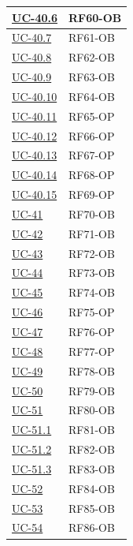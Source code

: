 ﻿\documentclass[a4paper,12pt]{article}
\begin{document}
\begin{description}[style=multiline, leftmargin=4cm, font=\bfseries]
\begin{enumerate}[leftmargin=*, nosep]
{\begin{longtable}{|p{4cm}|p{4cm}|}
    \hline
    \hyperref[fig:uc-40.6]{UC-40.6} & RF60-OB \\
    \hline
    \hyperref[fig:uc-40.7]{UC-40.7} & RF61-OB \\
    \hline
    \hyperref[fig:uc-40.8]{UC-40.8} & RF62-OB \\
    \hline
    \hyperref[fig:uc-40.9]{UC-40.9} & RF63-OB \\
    \hline
    \hyperref[fig:uc-40.10]{UC-40.10} & RF64-OB \\
    \hline
    \hyperref[fig:uc-40.11]{UC-40.11} & RF65-OP \\
    \hline
    \hyperref[fig:uc-40.12]{UC-40.12} & RF66-OP \\
    \hline
    \hyperref[fig:uc-40.13]{UC-40.13} & RF67-OP \\
    \hline
    \hyperref[fig:uc-40.14]{UC-40.14} & RF68-OP \\
    \hline
    \hyperref[fig:uc-40.15]{UC-40.15} & RF69-OP \\
    \hline
    \hyperref[fig:uc-41]{UC-41} & RF70-OB \\
    \hline
    \hyperref[fig:uc-42]{UC-42} & RF71-OB \\
    \hline
    \hyperref[fig:uc-43]{UC-43} & RF72-OB \\
    \hline
    \hyperref[fig:uc-44]{UC-44} & RF73-OB \\
    \hline
    \hyperref[fig:uc-45]{UC-45} & RF74-OB \\
    \hline
    \hyperref[fig:uc-46]{UC-46} & RF75-OP \\
    \hline
    \hyperref[fig:uc-47]{UC-47} & RF76-OP \\
    \hline
    \hyperref[fig:uc-48]{UC-48} & RF77-OP \\
    \hline
    \hyperref[fig:uc-49]{UC-49} & RF78-OB \\
    \hline
    \hyperref[fig:uc-50]{UC-50} & RF79-OB \\
    \hline
    \hyperref[fig:uc-51]{UC-51} & RF80-OB \\
    \hline
    \hyperref[fig:uc-51.1]{UC-51.1} & RF81-OB \\
    \hline
    \hyperref[fig:uc-51.2]{UC-51.2} & RF82-OB \\
    \hline
    \hyperref[fig:uc-51.3]{UC-51.3} & RF83-OB \\
    \hline
    \hyperref[fig:uc-52]{UC-52} & RF84-OB \\
    \hline
    \hyperref[fig:uc-53]{UC-53} & RF85-OB \\
    \hline
    \hyperref[fig:uc-54]{UC-54} & RF86-OB \\

\end{longtable}}
\end{enumerate}
\end{description}
\end{document}
